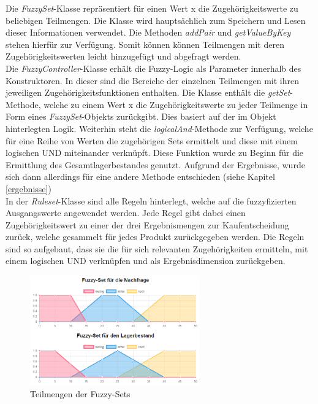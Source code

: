 \documentclass[]{scrartcl}
\begin{document}
Die \textit{FuzzySet}-Klasse repräsentiert für einen Wert x die Zugehörigkeitswerte zu beliebigen Teilmengen. Die Klasse wird hauptsächlich zum Speichern und Lesen dieser Informationen verwendet. Die Methoden \textit{addPair} und \textit{getValueByKey} stehen hierfür zur Verfügung. Somit können können Teilmengen mit deren Zugehörigkeitswerten leicht  hinzugefügt und abgefragt werden.
\\

Die \textit{FuzzyController}-Klasse erhält die Fuzzy-Logic als Parameter innerhalb des Konstruktoren. In dieser sind die Bereiche der einzelnen Teilmengen mit ihren jeweiligen Zugehörigkeitsfunktionen enthalten. Die Klasse enthält die \textit{getSet}-Methode, welche zu einem Wert x die Zugehörigkeitswerte zu jeder Teilmenge in Form eines \textit{FuzzySet}-Objekts zurückgibt. Dies basiert auf der im Objekt hinterlegten Logik. Weiterhin steht die \textit{logicalAnd}-Methode zur Verfügung, welche für eine Reihe von Werten die zugehörigen Sets ermittelt und diese mit einem logischen UND miteinander verknüpft. Diese Funktion wurde zu Beginn für die Ermittlung des Gesamtlagerbestandes genutzt. Aufgrund der Ergebnisse, wurde sich dann allerdings für eine andere Methode entschieden (siehe Kapitel \ref{ergebnisse})
\\

In der \textit{Ruleset}-Klasse sind alle Regeln hinterlegt, welche auf die fuzzyfizierten Ausgangswerte angewendet werden. Jede Regel gibt dabei einen Zugehörigkeitswert zu einer der drei Ergebnismengen zur Kaufentscheidung zurück, welche gesammelt für jedes Produkt zurückgegeben werden. Die Regeln sind so aufgebaut, dass sie die für sich relevanten Zugehörigkeiten ermitteln, mit einem logischen UND verknüpfen und als Ergebnisdimension zurückgeben.

\begin{figure}[htbp]
	\centering
	\includegraphics[width=0.65\textwidth]{res/fuzzy.png}
	\caption{Teilmengen der Fuzzy-Sets}
	\label{img:fuzzy}
\end{figure}
\end{document}
